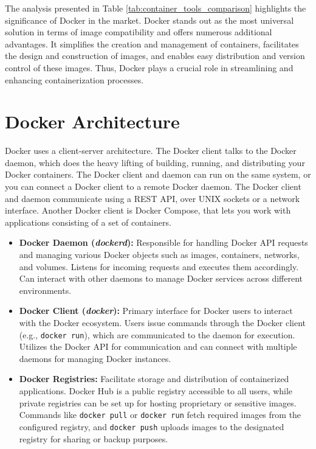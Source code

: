 The analysis presented in Table \ref{tab:container_tools_comparison} highlights the significance of Docker in the market. Docker stands out as the most universal solution in terms of image compatibility and offers numerous additional advantages. It simplifies the creation and management of containers, facilitates the design and construction of images, and enables easy distribution and version control of these images. Thus, Docker plays a crucial role in streamlining and enhancing containerization processes.

\section{Docker Architecture}
Docker uses a client-server architecture. The Docker client talks to the Docker daemon, which does the heavy lifting of building, running, and distributing your Docker containers. The Docker client and daemon can run on the same system, or you can connect a Docker client to a remote Docker daemon. The Docker client and daemon communicate using a REST API, over UNIX sockets or a network interface. Another Docker client is Docker Compose, that lets you work with applications consisting of a set of containers.
\newpage
\begin{itemize}
  \item \textbf{Docker Daemon (\textit{dockerd}):} Responsible for handling Docker API requests and managing various Docker objects such as images, containers, networks, and volumes. Listens for incoming requests and executes them accordingly. Can interact with other daemons to manage Docker services across different environments.
  
  \item \textbf{Docker Client (\textit{docker}):} Primary interface for Docker users to interact with the Docker ecosystem. Users issue commands through the Docker client (e.g., \texttt{docker run}), which are communicated to the daemon for execution. Utilizes the Docker API for communication and can connect with multiple daemons for managing Docker instances.
  
  \item \textbf{Docker Registries:} Facilitate storage and distribution of containerized applications. Docker Hub is a public registry accessible to all users, while private registries can be set up for hosting proprietary or sensitive images. Commands like \texttt{docker pull} or \texttt{docker run} fetch required images from the configured registry, and \texttt{docker push} uploads images to the designated registry for sharing or backup purposes.
\end{itemize}

